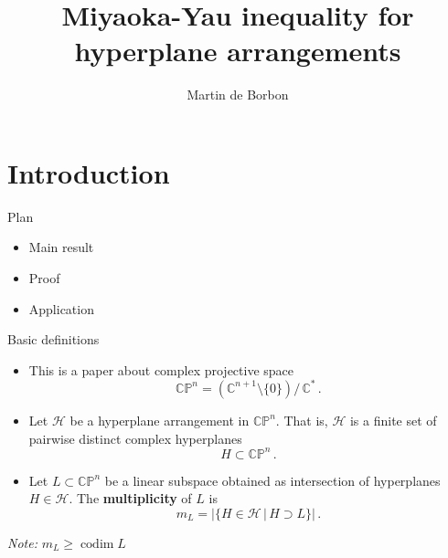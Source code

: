 \documentclass{beamer}
\title[]{Miyaoka-Yau inequality for hyperplane arrangements}
\author[Integrable Day]{Martin de Borbon}
\institute[Loughborough]{Loughborough University}
\date{}
\newcommand{\C}{\mathbb{C}}
\newcommand{\CP}{\mathbb{CP}}
\newcommand{\mH}{\mathcal{H}}
\DeclareMathOperator{\codim}{codim}
\begin{document}
\begin{frame}
  \titlepage
\end{frame}


\section{Introduction}

\begin{frame}{Plan}
	\begin{itemize}
		\item Main result
		\vfill
		\item Proof
		\vfill
		\item Application
	\end{itemize}
\end{frame}

\begin{frame}{Basic definitions}
	\begin{itemize}
		\item This is a paper about complex projective space
		\begin{equation*}
			\CP^n = \left(\C^{n+1} \setminus \{0\}\right) \big/ \, \C^*	\,.
		\end{equation*} 
		\vfill
		
		\item Let \(\mH\) be a hyperplane arrangement in \(\CP^n\).
		That is, \(\mH\) is a finite set of pairwise distinct complex hyperplanes 
		\[
		H \subset \CP^n \,.
		\]
		\vfill
		
		\item Let \(L \subset \CP^n\) be a linear subspace  obtained as intersection of hyperplanes \(H \in \mH\). 
		The \textbf{multiplicity} of \(L\) is
		\[
		m_L = \big| \{H \in \mH \,|\, H \supset L\} \big| \,.
		\]
	\end{itemize}
	
\emph{Note:} \(m_L \geq \codim L\)
\end{frame}
\end{document}
